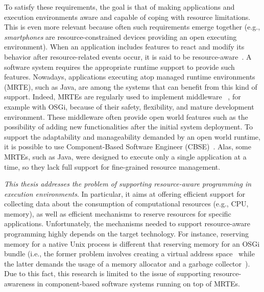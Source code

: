 To satisfy these requirements, the goal is that of making applications and execution environments aware and capable of coping with resource limitations.
This is even more relevant because often such requirements emerge together
(e.g., \textit{smartphones} are resource-constrained devices providing an open executing environment).
When an application includes features to react and modify its behavior after resource-related events occur, it is said to be resource-aware~\cite{Boldrini:2008:CRA:1549824.1550106,Peddemors:2007:NRA:1256316.1256338,Alhaisoni:2010:RTO:1664767.1664770,Polo:2011:RAS:2414338.2414352,Bulej:2012:PAC:2408860.2410068,autili2012hybrid}.
A software system requires the appropriate runtime support to provide such features.
Nowadays, applications executing atop managed runtime environments (MRTE), such as Java, are among the systems that can benefit from this kind of support.
Indeed, MRTEs are regularly used to implement middleware ~\cite{Bruneton:2006:FCM:1152333.1152345,Fouquet:2014:DED:2602576.2611461,OracleEJB3.0,Becker:2010:PCM:1712605.1712651,Carlson2006127}, for example with OSGi, because of their safety, flexibility, and mature development environment.
These middleware often provide open world features such as the possibility of adding new functionalities after the initial system deployment.
To support the adaptability and manageability demanded by an open world runtime, it is possible to use  Component-Based Software Engineer (CBSE)~\cite{gruntz2002component,Duclos:2002:DUN:508386.508394, Bruneton:2006:FCM:1152333.1152345}.
Alas, some MRTEs, such as Java, were designed to execute only a single application at a time, so they lack full support for fine-grained resource management.

  
\textit{This thesis addresses the problem of supporting resource-aware programming in execution environments}.
In particular, it aims at offering efficient support for collecting data about the consumption of computational resources (e.g., CPU, memory), as well as efficient mechanisms to reserve resources for specific applications.
Unfortunately, the mechanisms needed to support resource-aware programming highly depends on the target technology.
For instance, reserving memory for a native Unix process is different that reserving memory for an OSGi bundle (i.e., the former problem involves creating a virtual address space~\cite{Stallings2014} while the latter demands the usage of a memory allocator and a garbage collector~\cite{OSGiAlliance2014,alpern2000jalapeno,Richard2012,Geoffray:2010:VSM:1837854.1736006}).
Due to this fact, this research is limited to the issue of supporting resource-awareness in component-based software systems running on top of MRTEs.


